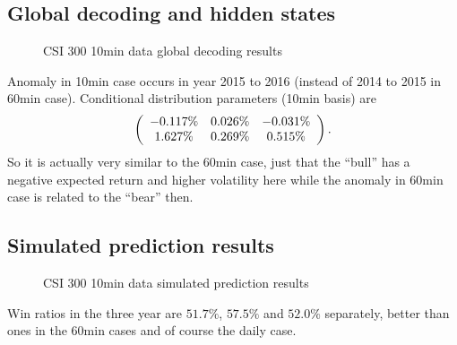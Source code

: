 \subsection{Global decoding and hidden states}
\label{sec:positive:CSI10:states}
        \begin{figure}[!hbt]
        \begin{center}
        \end{center}
        \caption{CSI 300 10min data global decoding results}
        \label{fig:CSI10:states}
        \end{figure}
Anomaly in 10min case occurs in year 2015 to 2016 (instead of 2014 to 2015 in 60min case).
Conditional distribution parameters (10min basis) are
        \begin{equation}
        \left (
        \begin{array}{c c c}
        -0.117\%  &  0.026\%  &  -0.031\%  \\
         1.627\%  &  0.269\%  &   0.515\%  \\
        \end{array}
        \right ).
        \end{equation}
So it is actually very similar to the 60min case,
just that the ``bull'' has a negative expected return and higher volatility here
while the anomaly in 60min case is related to the ``bear'' then.

\subsection{Simulated prediction results}
\label{sec:positive:CSI10:prediction}
        \begin{figure}[!hbt]
        \begin{center}
        \end{center}
        \caption{CSI 300 10min data simulated prediction results}
        \label{fig:CSI10:prediction}
        \end{figure}
Win ratios in the three year are $51.7\%$, $57.5\%$ and $52.0\%$ separately,
better than ones in the 60min cases and of course the daily case.


